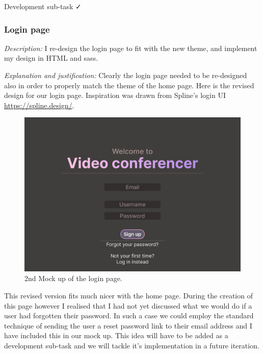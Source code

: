 {\color{gray} \hrulefill} \vspace{0.2cm}

{\sffamily Development sub-task  \faCheck}

\subsubsection{Login page}

\textit{Description:} I re-design the login page to fit with the
new theme, and implement my design in HTML and sass.\\ \vspace{0.2cm}

\textit{Explanation and justification:}
Clearly the login page needed to be re-designed also in order
to properly match the theme of the home page. Here is the
revised design for our login page. Inspiration was drawn
from Spline's login UI \url{https://spline.design/}.

\begin{figure}[H]
\centering

\includegraphics[scale=0.2]{Images/Login_Page_2.png}

\caption{2nd Mock up of the login page.}
\end{figure}

This revised version fits much nicer with the home page.
During the creation of this page however I realised that I
had not yet discussed what we would do if a user had
forgotten their password. In such a case we could employ
the standard technique of sending the user a reset password
link to their email address and I have included this in
our mock up. This idea will have to be added as a development
sub-task and we will tackle it's implementation in a future
iteration. \\ \vspace{0.2cm}

